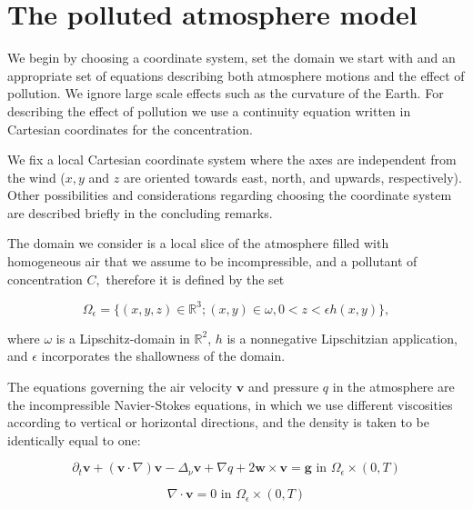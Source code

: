 \documentclass[11pt]{article}
\begin{document}
\section{The polluted atmosphere model} \label{eqsdescribingatmpluspollution}

We begin by choosing a coordinate system, set the domain we start with and an appropriate set of equations describing both atmosphere motions and the effect of pollution. We ignore large scale effects such as the curvature of the Earth. For describing the effect of pollution we use a continuity equation written in Cartesian coordinates for the concentration.

We fix a local Cartesian coordinate system where the axes are independent from the wind ($x, y$ and $z$ are oriented towards east, north, and upwards, respectively). Other possibilities and considerations regarding choosing the coordinate system are described briefly in the concluding remarks.

The domain we consider is a local slice of the atmosphere filled with homogeneous air that we assume to be incompressible, and a pollutant of concentration $C,$ therefore it is defined by the set

\begin{equation}
  \Omega_{\epsilon} = \{(x,y,z) \in \mathbb{R}^3 ; (x,y) \in \omega, 0 < z < \epsilon h(x,y) \},
\end{equation}

where $\omega$ is a Lipschitz-domain in $\mathbb{R}^2$, $h$ is a nonnegative Lipschitzian application, and $\epsilon$ incorporates the shallowness of the domain.

The equations governing the air velocity $\mathbf{v}$ and pressure $q$ in the atmosphere are the incompressible Navier-Stokes equations, in which we use different viscosities according to vertical or horizontal directions, and the density is taken to be identically equal to one:

\begin{equation} \label{originalEQ-V}
  \partial_t \mathbf{v} + (\mathbf{v} \cdot \nabla)\mathbf{v} -\Delta_{\nu} \mathbf{v} + \nabla q + 2 \mathbf{w} \times \mathbf{v}= \mathbf{g} \text{ in } \Omega_{\epsilon} \times (0,T)
\end{equation}
    
\begin{equation} \label{originalEQ-I}
  \nabla \cdot \mathbf{v} = 0 \text{ in } \Omega_{\epsilon} \times (0,T)
\end{equation}
\end{document}
